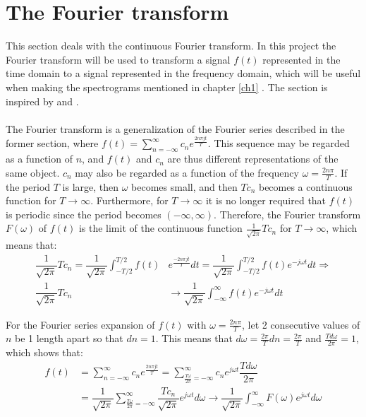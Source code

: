 \section{The Fourier transform}
This section deals with the continuous Fourier transform. In this project the Fourier transform will be used to transform a signal $f(t)$ represented in the time domain to a signal represented in the frequency domain, which will be useful when making the spectrograms mentioned in chapter \ref{ch1} . The section is inspired by \cite{FourierTrans} and \cite{FAA}.
\\ \\
The Fourier transform is a generalization of the Fourier series described in the former section, where $f(t) = \sum_{n=-\infty}^\infty c_n e^{\frac{2n\pi j t}{T}}$. This sequence may be regarded as a function of $n$, and $f(t)$ and $c_n$ are thus different representations of the same object. $c_n$ may also be regarded as a function of the frequency $\omega = \frac{2n\pi}{T}$. If the period $T$ is large, then $\omega$ becomes small, and then $Tc_n$ becomes a continuous function for $T \to \infty$. Furthermore, for $T \to \infty$ it is no longer required that $f(t)$ is periodic since the period becomes $(-\infty,\infty)$. Therefore, the Fourier transform $F(\omega)$ of $f(t)$ is the limit of the continuous function $\frac{1}{\sqrt{2\pi}} T c_n$ for $T \to \infty$, which means that:
\begin{align*}
\dfrac{1}{\sqrt{2\pi}} T c_n = \dfrac{1}{\sqrt{2\pi}} \int_{-T/2}^{T/2} f(t) &e^{\frac{-2n\pi j t}{T}} dt = \dfrac{1}{\sqrt{2\pi}} \int_{-T/2}^{T/2} f(t) e^{-j\omega t} dt \Rightarrow \\
\dfrac{1}{\sqrt{2\pi}} T c_n &\to \dfrac{1}{\sqrt{2\pi}} \int_{-\infty}^\infty f(t) e^{-j \omega t} dt
\end{align*}

For the Fourier series expansion of $f(t)$ with $\omega = \frac{2n\pi}{T}$, let 2 consecutive values of $n$ be 1 length apart so that $dn = 1$. This means that $d\omega = \frac{2\pi}{T} dn = \frac{2\pi}{T}$ and $\frac{T d\omega}{2\pi} = 1$, which shows that:
\begin{align*}
f(t) &= \sum_{n=-\infty}^\infty c_n e^{\frac{2n\pi j t}{T}} = \sum_{\frac{T\omega}{2\pi}=-\infty}^\infty c_n e^{j \omega t} \dfrac{T d\omega}{2 \pi} \\
&= \dfrac{1}{\sqrt{2\pi}} \sum_{\frac{T\omega}{2\pi}=-\infty}^\infty \dfrac{T c_n}{\sqrt{2\pi}} e^{j \omega t} d\omega \to \dfrac{1}{\sqrt{2\pi}} \int_{-\infty}^\infty F(\omega) e^{j \omega t} d \omega
\end{align*}


